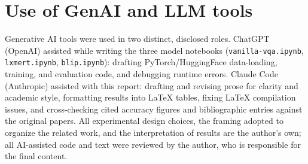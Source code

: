 \section{Use of GenAI and LLM tools}
Generative AI tools were used in two distinct, disclosed roles. ChatGPT (OpenAI) assisted while writing the three model notebooks (\texttt{vanilla-vqa.ipynb}, \texttt{lxmert.ipynb}, \texttt{blip.ipynb}): drafting PyTorch/HuggingFace data-loading, training, and evaluation code, and debugging runtime errors. Claude Code (Anthropic) assisted with this report: drafting and revising prose for clarity and academic style, formatting results into LaTeX tables, fixing LaTeX compilation issues, and cross-checking cited accuracy figures and bibliographic entries against the original papers. All experimental design choices, the framing adopted to organize the related work, and the interpretation of results are the author's own; all AI-assisted code and text were reviewed by the author, who is responsible for the final content.
